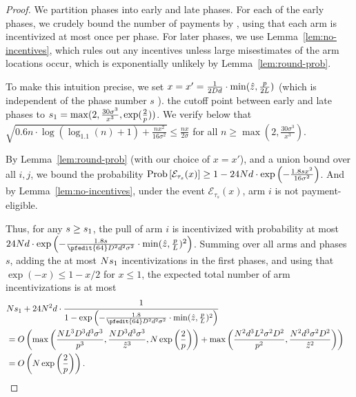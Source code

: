 \begin{proof}
We partition phases into early and late phases.
For each of the early phases,
we crudely bound the number of payments by \ARMNUM,
using that each arm is incentivized at most once per phase.
For later phases,
we use Lemma~\ref{lem:no-incentives},
which rules out any incentives unless large misestimates of the arm
locations occur, which is exponentially unlikely by 
Lemma~\ref{lem:round-prob}.

To make this intuition precise, we set
$x = x' = \frac{1}{2 D d} \cdot \min(\hat{z}, \frac{p}{2 L})$
(which is independent of the phase number $s$
).
 the cutoff point between early and late phases to
$s_1 = \max(2, \frac{30 \sigma^3}{x^3}, \exp(\frac{2}{p}))$.
We verify below that
$\sqrt{0.6 n \cdot \log (\log_{1.1}(n) + 1) + \frac{n x^2}{16 \sigma^2}}
\leq \frac{n x}{2 \sigma}$
for all $n \geq \max(2, \frac{30 \sigma^3}{x^3})$.


By Lemma~\ref{lem:round-prob} (with our choice of $x = x'$),
and a union bound over all $i,j$, we bound the probability
$\Prob{\AccEU{\tau_s}{x}}
\geq 1 - 24 \ARMNUM d \cdot \exp\left(-\frac{1.8 s x^2}{16 \sigma^2} \right)$.
And by Lemma~\ref{lem:no-incentives},
under the event ${\mathcal E}_{\tau_s}(x)$,
arm $i$ is not payment-eligible.

Thus, for any $s \geq s_1$,
the  pull of arm $i$ is incentivized  
with probability at most
$24 \ARMNUM d \cdot \exp \left(
- \frac{1.8 s}{\pfedit{64} \Diam^2 d^2 \sigma^2}
  \cdot \min(\TieCutoff, \frac{\MinProb}{\TieDensity})^2
\right)$.
Summing over all arms and phases $s$,
adding the at most $N s_1$ incentivizations in
the first \EvenLaterPhase phases, 
and using that $\exp(-x) \leq 1-x/2$ for $x \leq 1$,
the expected total number of arm incentivizations is at most
\begin{align*}
\lefteqn{\ARMNUM \EvenLaterPhase
  + 24 \ARMNUM^2 d \cdot \frac{1}{1 - \exp \left(
- \frac{1.8}{\pfedit{64} \Diam^2 d^2 \sigma^2}
  \cdot \min(\TieCutoff, \frac{\MinProb}{\TieDensity})^2
  \right)}}
\\ & = O\left( \max \left(
     \frac{\ARMNUM \TieDensity^3 \Diam^3 d^3 \sigma^3}{\MinProb^3},
\frac{\ARMNUM \Diam^3 d^3 \sigma^3}{\TieCutoff^3},
     \ARMNUM \exp \left(\frac{2}{\MinProb} \right) \right)
+ \max \left(
     \frac{\ARMNUM^2 d^3 \TieDensity^2 \sigma^2 \Diam^2}{\MinProb^2},
\frac{\ARMNUM^2 d^3 \sigma^2 \Diam^2}{\TieCutoff^2}
\right) \right)
\\ & = O\left( \ARMNUM \exp \left(\frac{2}{\MinProb}\right) \right).
\end{align*}


\end{proof}
